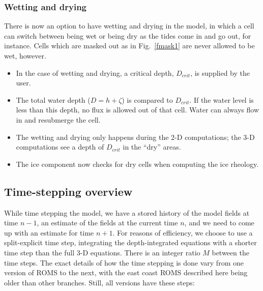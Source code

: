 

\subsubsection{Wetting and drying}

There is now an option to have wetting and drying in the model, in
which a cell can switch between being wet or being dry as the tides
come in and go out, for instance. Cells which are masked out as in
Fig.~\ref{fmask1} are never allowed to be wet, however.
\begin{itemize}
   \item In the case of wetting and drying, a critical depth, $D_{crit}$,
is supplied by the user.
   \item The total water depth ($D=h+\zeta$) is compared to $D_{crit}$.
If the water level is less than this depth, no flux is allowed out
of that cell. Water can always flow in and resubmerge the cell.
  \item The wetting and drying only happens during the 2-D
computations; the 3-D computations see a depth of
$D_{crit}$ in the ``dry'' areas.
  \item The ice component now checks for dry cells when computing
the ice rheology.
\end{itemize}

\subsection{Time-stepping overview}

While time stepping the model, we have a stored history of the model fields
at time $n-1$, an estimate of the fields at the current time $n$, and
we need to come up with an estimate for time $n+1$. For reasons of
efficiency, we choose to use a split-explicit time step, integrating
the depth-integrated equations with a shorter time step than the full
3-D equations. There is an integer ratio $M$ between the time steps. The
exact details of how the time stepping is done vary from one version
of ROMS to the next, with the east coast ROMS described here being older
than other branches. Still, all versions have these steps:

